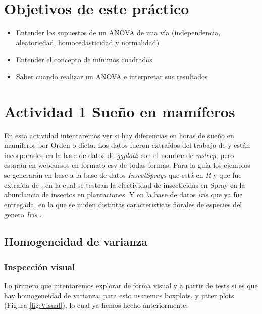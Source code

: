 \documentclass[]{book}
\providecommand{\tightlist}{%
  \setlength{\itemsep}{0pt}\setlength{\parskip}{0pt}}
\begin{document}
\hypertarget{objetivos-de-este-practico}{%
\section{Objetivos de este práctico}\label{objetivos-de-este-practico}}

\begin{itemize}
\tightlist
\item
  Entender los supuestos de un ANOVA de una vía (independencia, aleatoriedad, homocedasticidad y normalidad)
\item
  Entender el concepto de mínimos cuadrados
\item
  Saber cuando realizar un ANOVA e interpretar sus resultados
\end{itemize}

\hypertarget{actividad-1-sueno-en-mamiferos}{%
\section{Actividad 1 Sueño en mamíferos}\label{actividad-1-sueno-en-mamiferos}}

En esta actividad intentaremos ver si hay diferencias en horas de sueño en mamíferos por Orden o dieta. Los datos fueron extraídos del trabajo de \citet{savage2007quantitative} y están incorporados en la base de datos de \emph{ggplot2} con el nombre de \emph{msleep}, pero estarán en webcursos en formato csv de todas formas. Para la guía los ejemplos se generarán en base a la base de datos \emph{InsectSprays} que está en \emph{R} y que fue extraída de \citet{beall1942transformation}, en la cual se testean la efectividad de insecticidas en Spray en la abundancia de insectos en plantaciones. Y en la base de datos \emph{iris} que ya fue entregada, en la que se miden distintas características florales de especies del genero \emph{Iris} \citep{anderson1935irises}.

\hypertarget{homogeneidad-de-varianza}{%
\subsection{Homogeneidad de varianza}\label{homogeneidad-de-varianza}}

\hypertarget{inspeccion-visual}{%
\subsubsection{Inspección visual}\label{inspeccion-visual}}

Lo primero que intentaremos explorar de forma visual y a partir de tests si es que hay homogeneidad de varianza, para esto usaremos boxplots, y jitter plots (Figura \ref{fig:Visual}), lo cual ya hemos hecho anteriormente:
\end{document}
